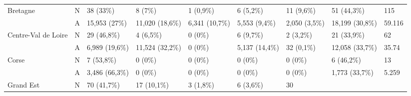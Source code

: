 \begin{table}[H]
{\begin{tabular}{|l|l|l|l|l|l|l|l|l|}
            Bretagne                                          & N               & 38 (33\%)                         & 8 (7\%)         & 1 (0,9\%)        & 6 (5,2\%)      & 11 (9,6\%)
                                                              & 51 (44,3\%)     & 115                                                                                                          \\
            ~                                                 & A               & 15,953 (27\%)                     & 11,020 (18,6\%) & 6,341 (10,7\%)   & 5,553 (9,4\%)
                                                              & 2,050 (3,5\%)   & 18,199 (30,8\%)                   & 59.116                                                                   \\ \hline
            Centre-Val de Loire                               & N               & 29 (46,8\%)                       & 4 (6,5\%)       & 0 (0\%)          & 6 (9,7\%)
                                                              & 2 (3,2\%)       & 21 (33,9\%)                       & 62                                                                       \\
            ~                                                 & A               & 6,989 (19,6\%)                    & 11,524 (32,2\%) & 0 (0\%)          & 5,137 (14,4\%) & 32
            (0,1\%)                                           & 12,058 (33,7\%) & 35.74                                                                                                        \\ \hline
            Corse                                             & N               & 7 (53,8\%)                        & 0 (0\%)         & 0 (0\%)          & 0 (0\%)        & 0 (0\%)    & 6
            (46,2\%)                                          & 13                                                                                                                             \\
            ~                                                 & A               & 3,486 (66,3\%)                    & 0 (0\%)         & 0 (0\%)          & 0 (0\%)        & 0 (0\%)    & 1,773
            (33,7\%)                                          & 5.259                                                                                                                          \\ \hline
            Grand Est                                         & N               & 70 (41,7\%)                       & 17 (10,1\%)     & 3 (1,8\%)        & 6 (3,6\%)      & 30

\end{tabular}}
\end{table}
